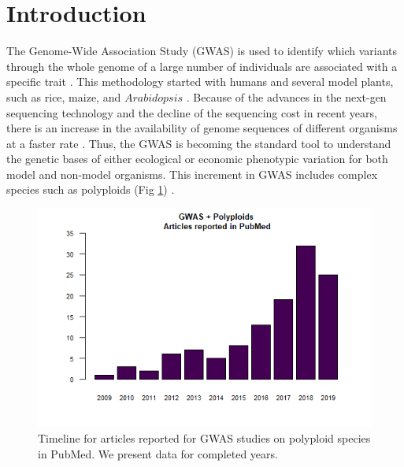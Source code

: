 \documentclass{article}
\begin{document}
\section{Introduction}

The Genome-Wide Association Study (GWAS) is used to identify which variants through the whole genome of a large number of individuals are associated with a specific trait \cite{cantor2010prioritizing, begum2012comprehensive}. This methodology started with humans and several model plants, such as rice, maize, and $Arabidopsis$ \cite{lauc2010genomics, tian2011genome, cao2011whole, korte2013advantages, han2013sequencing}. Because of the advances in the next-gen sequencing technology and the decline of the sequencing cost in recent years, there is an increase in the availability of genome sequences of different organisms at a faster rate \cite{ekblom2011applications, ellegren2014genome}. Thus, the GWAS is becoming the standard tool to understand the genetic bases of either ecological or economic phenotypic variation for both model and non-model organisms. This increment in GWAS includes complex species such as polyploids (Fig \ref{GWASpolyploids}) \cite{ekblom2011applications, santure2018wild}. 

\begin{figure}
\begin{center}
    
\includegraphics[width=12cm]{images/GWASpolyploids.png}

\caption{Timeline for articles reported for GWAS studies on polyploid species in PubMed. We present data for completed years.\label{GWASpolyploids}}
\end{center}

\end{figure}
\end{document}
